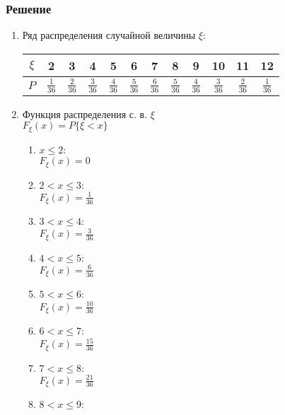\documentclass[12pt]{article}
\begin{document}
\subsubsection*{Решение}
\begin{enumerate}
	\item Ряд распределения случайной величины $\xi$: \\
	      \begin{center}
		      \begin{tabular}{ |c|c|c|c|c|c|c|c|c|c|c|c| }
			      \hline
			      $\xi$ & 2              & 3              & 4              & 5              & 6              & 7              & 8              & 9              & 10             & 11             & 12             \\
			      \hline
			      $P$   & $\frac{1}{36}$ & $\frac{2}{36}$ & $\frac{3}{36}$ & $\frac{4}{36}$ & $\frac{5}{36}$ & $\frac{6}{36}$ & $\frac{5}{36}$ & $\frac{4}{36}$ & $\frac{3}{36}$ & $\frac{2}{36}$ & $\frac{1}{36}$ \\
			      \hline
		      \end{tabular}
	      \end{center}
	\item Функция распределения с. в. $\xi$ \\
	      $F_{\xi}(x) = P\{\xi < x\}$ \\
	      \begin{enumerate}
		      \item $x \leq 2$: \\
		            $F_{\xi}(x) = 0$
		      \item $2 < x \leq 3$: \\
		            $F_{\xi}(x) = \frac{1}{36}$
		      \item $3 < x \leq 4$: \\
		            $F_{\xi}(x) = \frac{3}{36}$
		      \item $4 < x \leq 5$: \\
		            $F_{\xi}(x) = \frac{6}{36}$
		      \item $5 < x \leq 6$: \\
		            $F_{\xi}(x) = \frac{10}{36}$
		      \item $6 < x \leq 7$: \\
		            $F_{\xi}(x) = \frac{15}{36}$
		      \item $7 < x \leq 8$: \\
		            $F_{\xi}(x) = \frac{21}{36}$
		      \item $8 < x \leq 9$: \\

\end{enumerate}
\end{enumerate}
\end{document}
